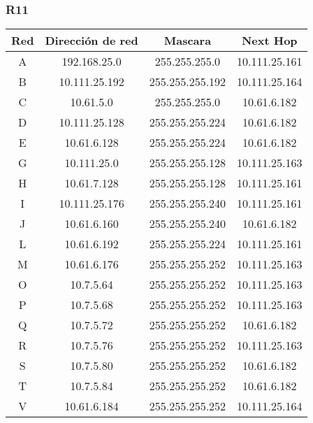 \subsubsection{R11}
\begin{table}[!htbp]
\centering
  \begin{tabular}{|c|c|c|c|}
    \hline
	Red & Dirección de red & Mascara & Next Hop\\ \hline
	A & 192.168.25.0 & 255.255.255.0 & 10.111.25.161 \\ \hline
	B & 10.111.25.192 & 255.255.255.192 & 10.111.25.164 \\ \hline
	C & 10.61.5.0 & 255.255.255.0 & 10.61.6.182 \\ \hline
	D & 10.111.25.128 & 255.255.255.224 & 10.61.6.182 \\ \hline
	E & 10.61.6.128 & 255.255.255.224 & 10.61.6.182 \\ \hline
	G & 10.111.25.0 & 255.255.255.128 & 10.111.25.163 \\ \hline
	H & 10.61.7.128 & 255.255.255.128 & 10.111.25.161 \\ \hline
	I & 10.111.25.176 & 255.255.255.240 & 10.111.25.161 \\ \hline
	J & 10.61.6.160 & 255.255.255.240 & 10.61.6.182 \\ \hline
	L & 10.61.6.192 & 255.255.255.224 & 10.111.25.161 \\ \hline
	M & 10.61.6.176 & 255.255.255.252 & 10.111.25.163 \\ \hline
	O & 10.7.5.64 & 255.255.255.252 & 10.111.25.163 \\ \hline
	P & 10.7.5.68 & 255.255.255.252 & 10.111.25.163 \\ \hline
	Q & 10.7.5.72 & 255.255.255.252 & 10.61.6.182 \\ \hline
	R & 10.7.5.76 & 255.255.255.252 & 10.111.25.163 \\ \hline
	S & 10.7.5.80 & 255.255.255.252 & 10.61.6.182 \\ \hline
	T & 10.7.5.84 & 255.255.255.252 & 10.61.6.182 \\ \hline
	V & 10.61.6.184 & 255.255.255.252 & 10.111.25.164 \\
    \hline
  \end{tabular}
\end{table}

\newpage
